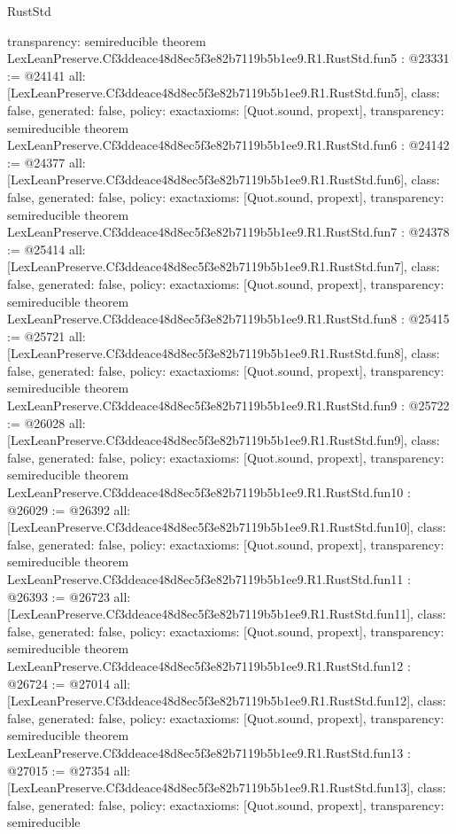 \begin{lexlean}{RustStd}
\begin{coremodule}
{  transparency: semireducible
}
theorem LexLeanPreserve.Cf3ddeace48d8ec5f3e82b7119b5b1ee9.R1.RustStd.fun5 : @23331 := @24141 {
  all: [LexLeanPreserve.Cf3ddeace48d8ec5f3e82b7119b5b1ee9.R1.RustStd.fun5],
  class: false,
  generated: false,
  policy: exact{axioms: [Quot.sound, propext]},
  transparency: semireducible
}
theorem LexLeanPreserve.Cf3ddeace48d8ec5f3e82b7119b5b1ee9.R1.RustStd.fun6 : @24142 := @24377 {
  all: [LexLeanPreserve.Cf3ddeace48d8ec5f3e82b7119b5b1ee9.R1.RustStd.fun6],
  class: false,
  generated: false,
  policy: exact{axioms: [Quot.sound, propext]},
  transparency: semireducible
}
theorem LexLeanPreserve.Cf3ddeace48d8ec5f3e82b7119b5b1ee9.R1.RustStd.fun7 : @24378 := @25414 {
  all: [LexLeanPreserve.Cf3ddeace48d8ec5f3e82b7119b5b1ee9.R1.RustStd.fun7],
  class: false,
  generated: false,
  policy: exact{axioms: [Quot.sound, propext]},
  transparency: semireducible
}
theorem LexLeanPreserve.Cf3ddeace48d8ec5f3e82b7119b5b1ee9.R1.RustStd.fun8 : @25415 := @25721 {
  all: [LexLeanPreserve.Cf3ddeace48d8ec5f3e82b7119b5b1ee9.R1.RustStd.fun8],
  class: false,
  generated: false,
  policy: exact{axioms: [Quot.sound, propext]},
  transparency: semireducible
}
theorem LexLeanPreserve.Cf3ddeace48d8ec5f3e82b7119b5b1ee9.R1.RustStd.fun9 : @25722 := @26028 {
  all: [LexLeanPreserve.Cf3ddeace48d8ec5f3e82b7119b5b1ee9.R1.RustStd.fun9],
  class: false,
  generated: false,
  policy: exact{axioms: [Quot.sound, propext]},
  transparency: semireducible
}
theorem LexLeanPreserve.Cf3ddeace48d8ec5f3e82b7119b5b1ee9.R1.RustStd.fun10 : @26029 := @26392 {
  all: [LexLeanPreserve.Cf3ddeace48d8ec5f3e82b7119b5b1ee9.R1.RustStd.fun10],
  class: false,
  generated: false,
  policy: exact{axioms: [Quot.sound, propext]},
  transparency: semireducible
}
theorem LexLeanPreserve.Cf3ddeace48d8ec5f3e82b7119b5b1ee9.R1.RustStd.fun11 : @26393 := @26723 {
  all: [LexLeanPreserve.Cf3ddeace48d8ec5f3e82b7119b5b1ee9.R1.RustStd.fun11],
  class: false,
  generated: false,
  policy: exact{axioms: [Quot.sound, propext]},
  transparency: semireducible
}
theorem LexLeanPreserve.Cf3ddeace48d8ec5f3e82b7119b5b1ee9.R1.RustStd.fun12 : @26724 := @27014 {
  all: [LexLeanPreserve.Cf3ddeace48d8ec5f3e82b7119b5b1ee9.R1.RustStd.fun12],
  class: false,
  generated: false,
  policy: exact{axioms: [Quot.sound, propext]},
  transparency: semireducible
}
theorem LexLeanPreserve.Cf3ddeace48d8ec5f3e82b7119b5b1ee9.R1.RustStd.fun13 : @27015 := @27354 {
  all: [LexLeanPreserve.Cf3ddeace48d8ec5f3e82b7119b5b1ee9.R1.RustStd.fun13],
  class: false,
  generated: false,
  policy: exact{axioms: [Quot.sound, propext]},
  transparency: semireducible
}
\end{coremodule}
\end{lexlean}
